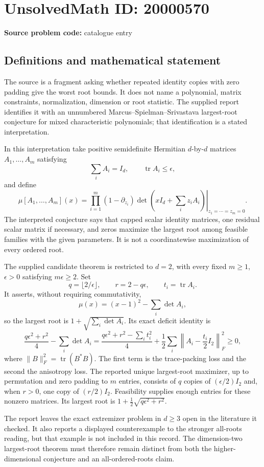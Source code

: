 \documentclass[11pt]{article}
\begin{document}
\section*{UnsolvedMath ID: 20000570}
\textbf{Source problem code:} catalogue entry
\subsection{Definitions and mathematical statement}
The source is a fragment asking whether repeated identity copies with zero padding give the worst root bounds. It does not name a polynomial, matrix constraints, normalization, dimension or root statistic. The supplied report identifies it with an unnumbered Marcus--Spielman--Srivastava largest-root conjecture for mixed characteristic polynomials; that identification is a stated interpretation.

In this interpretation take positive semidefinite Hermitian \(d\)-by-\(d\) matrices \(A_1,\ldots,A_m\) satisfying
\[
 \sum_iA_i=I_d,\qquad \operatorname{tr}A_i\le\epsilon,
\]
and define
\[
 \mu[A_1,\ldots,A_m](x)=
 \left.\prod_{i=1}^m(1-\partial_{z_i})
 \det\left(xI_d+\sum_i z_iA_i\right)\right|_{z_1=\cdots=z_m=0}.
\]
The interpreted conjecture says that capped scalar identity matrices, one residual scalar matrix if necessary, and zeros maximize the largest root among feasible families with the given parameters. It is not a coordinatewise maximization of every ordered root.

The supplied candidate theorem is restricted to \(d=2\), with every fixed \(m\ge1\), \(\epsilon>0\) satisfying \(m\epsilon\ge2\). Set
\[
 q=\lfloor2/\epsilon\rfloor,\qquad r=2-q\epsilon,\qquad t_i=\operatorname{tr}A_i.
\]
It asserts, without requiring commutativity,
\[
 \mu(x)=(x-1)^2-\sum_i\det A_i,
\]
so the largest root is \(1+\sqrt{\sum_i\det A_i}\). Its exact deficit identity is
\[
 \frac{q\epsilon^2+r^2}{4}-\sum_i\det A_i
 =\frac{q\epsilon^2+r^2-\sum_i t_i^2}{4}
 +\frac12\sum_i\left\|A_i-\frac{t_i}{2}I_2\right\|_F^2\ge0,
\]
where \(\|B\|_F^2=\operatorname{tr}(B^*B)\). The first term is the trace-packing loss and the second the anisotropy loss. The reported unique largest-root maximizer, up to permutation and zero padding to \(m\) entries, consists of \(q\) copies of \((\epsilon/2)I_2\) and, when \(r>0\), one copy of \((r/2)I_2\). Feasibility supplies enough entries for these nonzero matrices. Its largest root is \(1+\tfrac12\sqrt{q\epsilon^2+r^2}\).

The report leaves the exact extremizer problem in \(d\ge3\) open in the literature it checked. It also reports a displayed counterexample to the stronger all-roots reading, but that example is not included in this record. The dimension-two largest-root theorem must therefore remain distinct from both the higher-dimensional conjecture and an all-ordered-roots claim.
\end{document}

